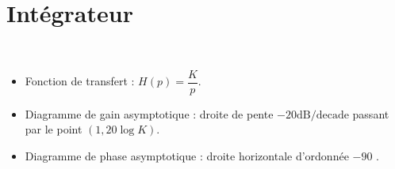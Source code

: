 \documentclass[10pt,fleqn]{article} %
\begin{document}
\section{Intégrateur}
\begin{resultat} ~\\

\vspace{-.5cm}

\noindent\begin{minipage}[c]{.53\linewidth}
\begin{itemize}
\item Fonction de transfert : $H(p)=\dfrac{K}{p}$.
\item Diagramme de gain asymptotique : droite de pente $-{20}\text{dB/decade}$ passant par le point $(1,20\log K)$.
\item Diagramme de phase asymptotique : droite horizontale d'ordonnée $-90$ \degre.
\end{itemize}
\end{minipage} \hfill
\begin{minipage}[c]{.45\linewidth}
\end{minipage}
\end{resultat}

\vspace{-.8cm}
\end{document}

